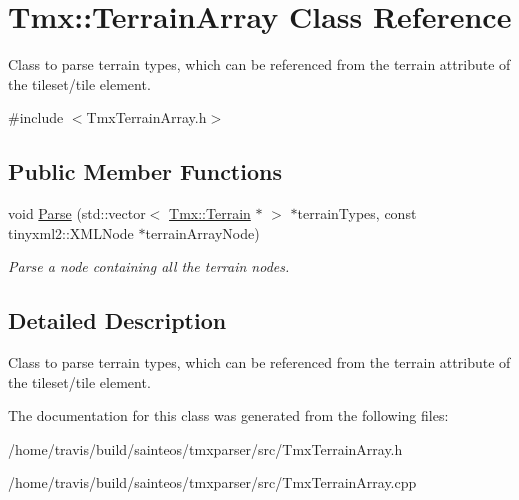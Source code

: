 \hypertarget{classTmx_1_1TerrainArray}{\section{Tmx\-:\-:Terrain\-Array Class Reference}
\label{classTmx_1_1TerrainArray}
}


Class to parse terrain types, which can be referenced from the terrain attribute of the tileset/tile element.  




{\ttfamily \#include $<$Tmx\-Terrain\-Array.\-h$>$}

\subsection*{Public Member Functions}
\begin{DoxyCompactItemize}
\item 
\hypertarget{classTmx_1_1TerrainArray_a95f03506b503efef05703db89dfff16e}{void \hyperlink{classTmx_1_1TerrainArray_a95f03506b503efef05703db89dfff16e}{Parse} (std\-::vector$<$ \hyperlink{classTmx_1_1Terrain}{Tmx\-::\-Terrain} $\ast$ $>$ $\ast$terrain\-Types, const tinyxml2\-::\-X\-M\-L\-Node $\ast$terrain\-Array\-Node)}\label{classTmx_1_1TerrainArray_a95f03506b503efef05703db89dfff16e}

\begin{DoxyCompactList}\small\item\em Parse a node containing all the terrain nodes. \end{DoxyCompactList}\end{DoxyCompactItemize}


\subsection{Detailed Description}
Class to parse terrain types, which can be referenced from the terrain attribute of the tileset/tile element. 



The documentation for this class was generated from the following files\-:\begin{DoxyCompactItemize}
\item 
/home/travis/build/sainteos/tmxparser/src/Tmx\-Terrain\-Array.\-h\item 
/home/travis/build/sainteos/tmxparser/src/Tmx\-Terrain\-Array.\-cpp\end{DoxyCompactItemize}
